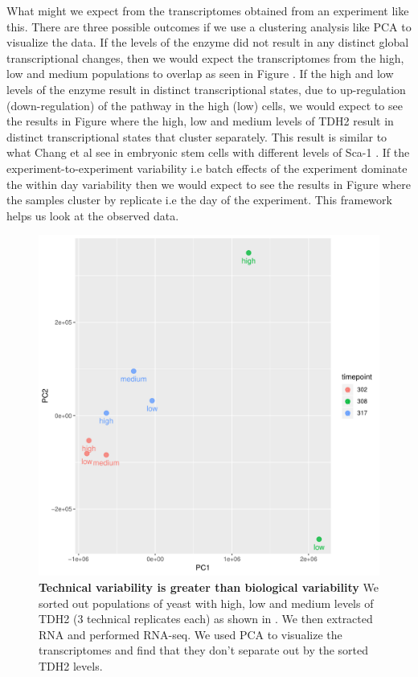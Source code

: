 What might we expect from the transcriptomes obtained from an experiment like this. There are three possible outcomes if we use a clustering analysis like PCA to visualize the data. If the levels of the enzyme did not result in any distinct global transcriptional changes, then we would expect the transcriptomes from the high, low and medium populations to overlap as seen in Figure . If the high and low levels of the enzyme result in distinct transcriptional states, due to up-regulation (down-regulation) of the pathway in the high (low) cells, we would expect to see the results in Figure  where the high, low and medium levels of TDH2 result in distinct transcriptional states that cluster separately. This result is similar to what Chang et al see in embryonic stem cells with different levels of Sca-1 \cite{chang2008n}. If the experiment-to-experiment variability i.e batch effects of the experiment dominate the within day variability then we would expect to see the results in Figure  where the samples cluster by replicate i.e the day of the experiment. This framework helps us look at the observed data.

\begin{figure}[t!]  
    \centering
    \includegraphics[width=\linewidth, scale=0.5]{figures/intro/intro_tdh2_clustering_timepoints.pdf}
    \caption[Technical variability is greater than biological variability]{%
     	\textbf{Technical variability is greater than biological variability}
     	We sorted out populations of yeast with high, low and medium levels of TDH2 (3 technical replicates each) as shown in . We then extracted RNA and performed RNA-seq. We used PCA to visualize the transcriptomes and find that they don't separate out by the sorted TDH2 levels.
    }
    \label{fig:intro5}
\end{figure}

